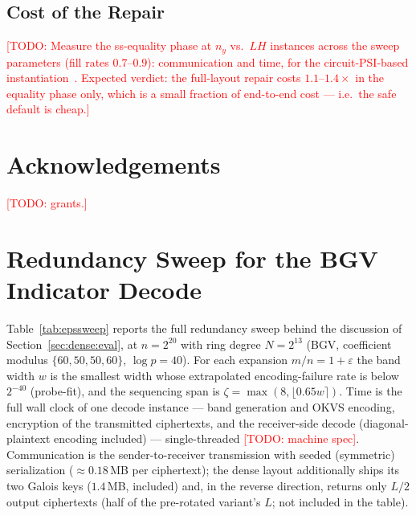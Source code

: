 \documentclass[runningheads]{llncs}
\newcommand{\TODO}[1]{\textcolor{red}{[TODO: #1]}}
\newcommand{\band}{w}                        %
\newcommand{\eps}{\varepsilon}               %
\newcommand{\half}{H}                        %
\begin{document}
\subsection{Cost of the Repair}
\label{sec:leak:cost}
\TODO{Measure the ss-equality phase at $n_y$ vs.\ $L\half$ instances across the
sweep parameters (fill rates $0.7$--$0.9$): communication and time, for the
circuit-PSI-based instantiation~\cite{EC:PSTY19,AC:LPRST21}. Expected verdict: the
full-layout repair costs $1.1$--$1.4\times$ in the equality phase only, which is a
small fraction of end-to-end cost --- i.e.\ the safe default is cheap.}

\section*{Acknowledgements}
\TODO{grants.}




\appendix

\section{Redundancy Sweep for the BGV Indicator Decode}
\label{app:epssweep}

Table~\ref{tab:epssweep} reports the full redundancy sweep behind the discussion of
Section~\ref{sec:dense:eval}, at $n=2^{20}$ with ring degree $N=2^{13}$ (BGV, coefficient
modulus $\{60,50,50,60\}$, $\log p=40$). For each expansion $m/n=1+\eps$ the band width $\band$
is the smallest width whose extrapolated encoding-failure rate is below $2^{-40}$ (probe-fit),
and the sequencing span is $\zeta=\max(8,\lfloor0.65\band\rceil)$. Time is the full wall clock of
one decode instance --- band generation and OKVS encoding, encryption of the transmitted
ciphertexts, and the receiver-side decode (diagonal-plaintext encoding included) --- single-threaded%
\TODO{machine spec}. Communication is the sender-to-receiver transmission with seeded (symmetric)
serialization ($\approx0.18$\,MB per ciphertext); the dense layout additionally ships its two
Galois keys ($1.4$\,MB, included) and, in the reverse direction, returns only $L/2$ output
ciphertexts (half of the pre-rotated variant's $L$; not included in the table).
\end{document}
